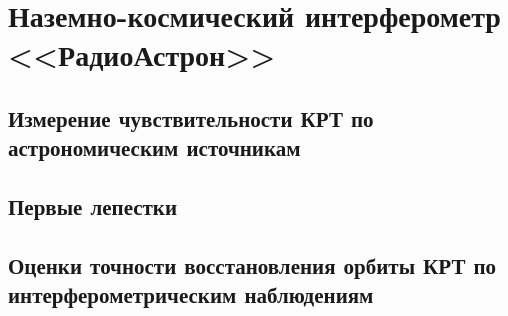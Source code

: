 \chapter{Наземно-космический интерферометр <<РадиоАстрон>>} \label{chapt2}



\section{Измерение чувствительности КРТ по астрономическим источникам}

\section{Первые лепестки}

\section{Оценки точности восстановления орбиты КРТ по интерферометрическим наблюдениям}
